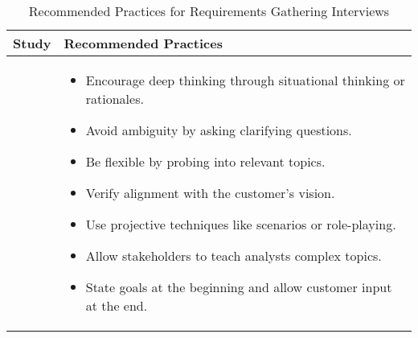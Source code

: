 \begin{table}[h!]
    \centering
    \small
    \begin{tabular}{|p{}|p{}|}
    \hline
    \textbf{Study} & \textbf{Recommended Practices} \\ \hline
    
    \textcite{interviews4, interviews3} & 
    \begin{itemize}
        \item Encourage deep thinking through situational thinking or rationales.
        \item Avoid ambiguity by asking clarifying questions.
        \item Be flexible by probing into relevant topics.
        \item Verify alignment with the customer's vision.
        \item Use projective techniques like scenarios or role-playing.
        \item Allow stakeholders to teach analysts complex topics.
        \item State goals at the beginning and allow customer input at the end.
    \end{itemize} \\ \hline
    
    \end{tabular}
    \label{tab:recommended_practices}
    \caption{Recommended Practices for Requirements Gathering Interviews}
\end{table}
    
